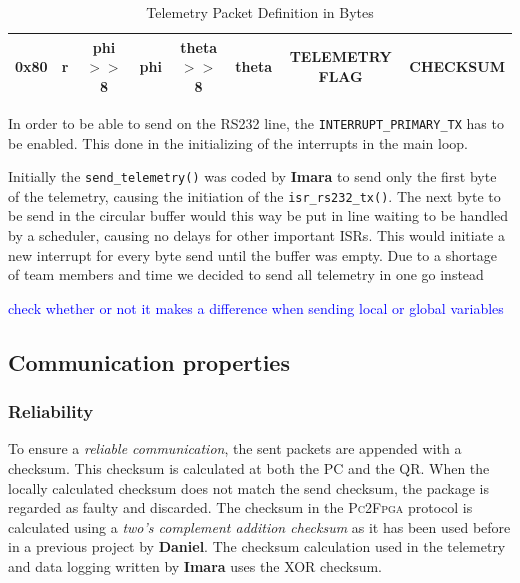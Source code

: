 \documentclass{article}
\newcommand\todo[1]{\textcolor{blue}{#1}} %
\begin{document}
\begin{table}[ht]
\centering
\begin{tabular}{|c|c|c|c|c|c|c|c|}
\hline 
0x80 & r & phi $>>$ 8 & phi & theta $>>$ 8 & theta & TELEMETRY FLAG & CHECKSUM \\
\hline 
\end{tabular} 
\caption{Telemetry Packet Definition in Bytes}
\label{tbl:TelPkgDefinition}
\end{table}

In order to be able to send on the RS232 line, the \texttt{INTERRUPT\_PRIMARY\_TX} has to be enabled. This done in the initializing of the interrupts in the main loop. 

Initially the \texttt{send\_telemetry()} was coded by \textbf{Imara} to send only the first byte of the telemetry, causing the initiation of the \texttt{isr\_rs232\_tx()}. The next byte to be send in the circular buffer would this way be put in line waiting to be handled by a scheduler, causing no delays for other important ISRs. This would initiate a new interrupt for every byte send until the buffer was empty. Due to a shortage of team members and time we decided to send all telemetry in one go instead

\todo{check whether or not it makes a difference when sending local or global variables}

% 

\subsection{Communication properties}
\subsubsection{Reliability} 
To ensure a \emph{reliable communication}, the sent packets are appended with a checksum.  This checksum is calculated at both the PC and the QR. When the locally calculated checksum does not match the send checksum, the package is regarded as faulty and discarded. The checksum in the \textsc{Pc2Fpga} protocol is calculated using a \emph{two's complement addition checksum} as it has been used before in a previous project by \textbf{Daniel}. The checksum calculation used in the telemetry and data logging written by \textbf{Imara} uses the \textsc{XOR} checksum.  
\end{document}
